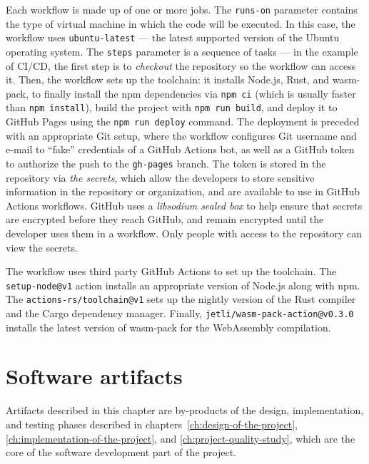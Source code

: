 \documentclass[english,engineering]{wizthesis}
\begin{document}
Each workflow is made up of one or more jobs. The \texttt{runs-on} parameter
contains the type of virtual machine in which the code will be executed. In this
case, the workflow uses \texttt{ubuntu-latest} --- the latest supported version
of the Ubuntu operating system. The \texttt{steps} parameter is a sequence of
tasks --- in the example of CI/CD, the first step is to \emph{checkout} the
repository so the workflow can access it. Then, the workflow sets up the
toolchain: it installs Node.js, Rust, and wasm-pack, to finally install the npm
dependencies via \texttt{npm ci} (which is usually faster than \texttt{npm
install}), build the project with \texttt{npm run build}, and deploy it to
GitHub Pages using the \texttt{npm run deploy} command. The deployment is
preceded with an appropriate Git setup, where the workflow configures Git
username and e-mail to ``fake'' credentials of a GitHub Actions bot, as well as
a GitHub token to authorize the push to the \texttt{gh-pages} branch. The token
is stored in the repository via \emph{the secrets}, which allow the developers
to store sensitive information in the repository or organization, and are
available to use in GitHub Actions workflows. GitHub uses a \emph{libsodium
sealed box} to help ensure that secrets are encrypted before they reach GitHub,
and remain encrypted until the developer uses them in a workflow. Only people
with access to the repository can view the secrets.

The workflow uses third party GitHub Actions to set up the toolchain. The
\verb|setup-node@v1| action installs an appropriate version of Node.js along
with npm. The \verb|actions-rs/toolchain@v1| sets up the nightly version of
the Rust compiler and the Cargo dependency manager. Finally,
\verb|jetli/wasm-pack-action@v0.3.0| installs the latest version of wasm-pack
for the Web\-Assembly compilation.


\chapter{Software artifacts}

Artifacts described in this chapter are by-products of the design,
implementation, and testing phases described in
chapters~\ref{ch:design-of-the-project}, \ref{ch:implementation-of-the-project},
and \ref{ch:project-quality-study}, which are the core of the software
development part of the project.
\end{document}
